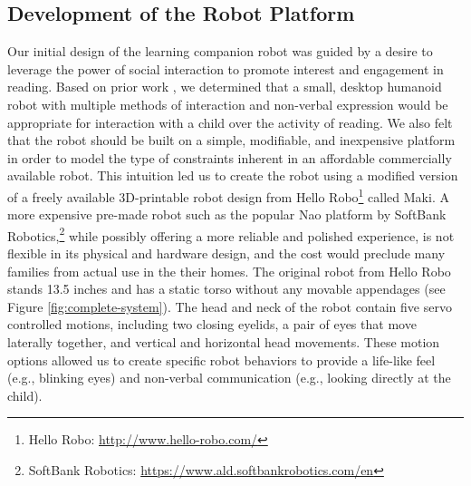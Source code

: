 \documentclass{sigchi}
\begin{document}
\subsection{Development of the Robot Platform}
Our initial design of the learning companion robot was guided by a desire to leverage the power of social interaction to promote interest and engagement in reading. Based on prior work \cite{Duffy:2003}, we determined that a small, desktop humanoid robot with multiple methods of interaction and non-verbal expression would be appropriate for interaction with a child over the activity of reading. We also felt that the robot should be built on a simple, modifiable, and inexpensive platform in order to model the type of constraints inherent in an affordable commercially available robot. This intuition led us to create the robot using a modified version of a freely available 3D-printable robot design from Hello Robo\footnote{Hello Robo: \href{http://www.hello-robo.com/}{http://www.hello-robo.com/}} called Maki. A more expensive pre-made robot such as the popular Nao platform by SoftBank Robotics,\footnote{SoftBank Robotics: \href{https://www.ald.softbankrobotics.com/en}{https://www.ald.softbankrobotics.com/en}} while possibly offering a more reliable and polished experience, is not flexible in its physical and hardware design, and the cost would preclude many families from actual use in the their homes. The original robot from Hello Robo stands 13.5 inches and has a static torso without any movable appendages (see Figure \ref{fig:complete-system}). The head and neck of the robot contain five servo controlled motions, including two closing eyelids, a pair of eyes that move laterally together, and vertical and horizontal head movements. These motion options allowed us to create specific robot behaviors to provide a life-like feel (e.g., blinking eyes) and non-verbal communication (e.g., looking directly at the child). 
\end{document}
